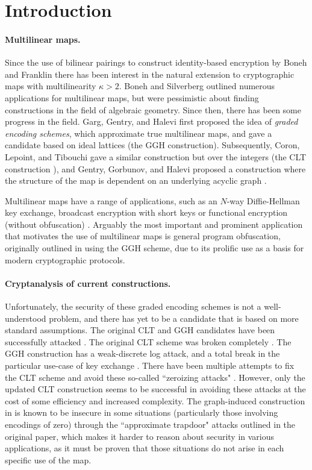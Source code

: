 \section{Introduction}

\paragraph{Multilinear maps.} Since the use of bilinear pairings to construct identity-based encryption by Boneh and Franklin \cite{bf} there has been interest in the natural extension to cryptographic maps with multilinearity $\kappa > 2$.  Boneh and Silverberg \cite{bs} outlined numerous applications for multilinear maps, but were pessimistic about finding constructions in the field of algebraic geometry.  Since then, there has been some progress in the field.  Garg, Gentry, and Halevi \cite{ggh13a} first proposed the idea of \textit{graded encoding schemes}, which approximate true multilinear maps, and gave a candidate based on ideal lattices (the GGH construction).  Subsequently, Coron, Lepoint, and Tibouchi gave a similar construction but over the integers (the CLT construction \cite{clt, clt15}), and Gentry, Gorbunov, and Halevi proposed a construction where the structure of the map is dependent on an underlying acyclic graph \cite{ggh14a}.

Multilinear maps have a range of applications, such as an $N$-way Diffie-Hellman key exchange, broadcast encryption with short keys \cite{bs} or functional encryption (without obfuscation) \cite{blr}.  Arguably the most important and prominent application that motivates the use of multilinear maps is general program obfuscation, originally outlined in \cite{ggh13b} using the GGH scheme, due to its prolific use as a basis for modern cryptographic protocols.

\paragraph{Cryptanalysis of current constructions.}  Unfortunately, the security of these graded encoding schemes is not a well-understood problem, and there has yet to be a candidate that is based on more standard assumptions.  The original CLT and GGH candidates have been successfully attacked \cite{chl, cgh, hj}.  The original CLT scheme was broken completely \cite{chl, cgh}.  The GGH construction has a weak-discrete log attack, and a total break in the particular use-case of key exchange \cite{cgh, hj}.  There have been multiple attempts to fix the CLT scheme and avoid these so-called ``zeroizing attacks" \cite{bwz, clt14, clt15}.  However, only the updated CLT construction \cite{clt15} seems to be successful in avoiding these attacks at the cost of some efficiency and increased complexity.  The graph-induced construction in \cite{ggh14a} is known to be insecure in some situations (particularly those involving encodings of zero) through the ``approximate trapdoor" attacks outlined in the original paper, which makes it harder to reason about security in various applications, as it must be proven that those situations do not arise in each specific use of the map.

